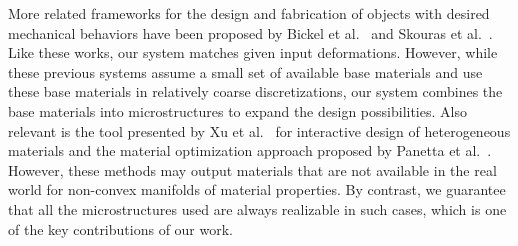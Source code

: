 More related frameworks for the design and fabrication of objects with desired mechanical behaviors have been proposed by Bickel et al.~\cite{Bickel2010} and Skouras et al.~\cite{Skouras2013}. Like these works, our system matches given input deformations. However, while these previous systems assume a small set of available base materials and use these base materials in relatively coarse discretizations, our system combines the base materials into microstructures to expand the design possibilities. Also relevant is the tool presented by Xu et al.~\cite{Xu2014} for interactive design of heterogeneous materials and the material optimization approach proposed by Panetta et al.~\cite{Panetta:2015}.
However, these methods may output materials that are not available in the real world for non-convex manifolds of material properties. By contrast, we guarantee that all the microstructures used are always realizable in such cases, which is one of the key contributions of our work.